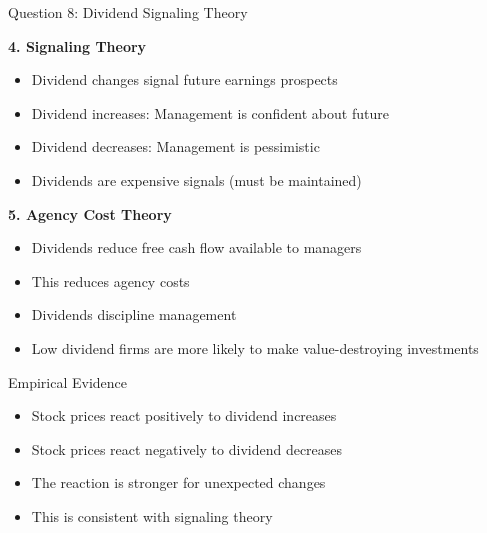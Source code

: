 \documentclass[aspectratio=169]{beamer}
\begin{document}
	\begin{frame}{Question 8: Dividend Signaling Theory}
		
		\textbf{4. Signaling Theory}
		\begin{itemize}
			\item Dividend changes signal future earnings prospects
			\item Dividend increases: Management is confident about future
			\item Dividend decreases: Management is pessimistic
			\item Dividends are expensive signals (must be maintained)
		\end{itemize}
		
		\textbf{5. Agency Cost Theory}
		\begin{itemize}
			\item Dividends reduce free cash flow available to managers
			\item This reduces agency costs
			\item Dividends discipline management
			\item Low dividend firms are more likely to make value-destroying investments
		\end{itemize}
		
		\begin{block}{Empirical Evidence}
			\begin{itemize}
				\item Stock prices react positively to dividend increases
				\item Stock prices react negatively to dividend decreases
				\item The reaction is stronger for unexpected changes
				\item This is consistent with signaling theory
			\end{itemize}
		\end{block}
	\end{frame}
	
\end{document}
